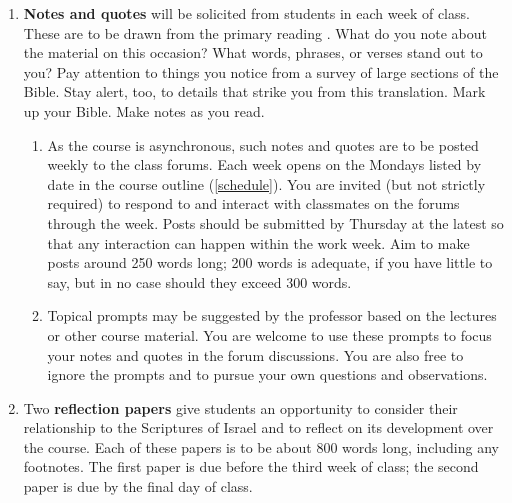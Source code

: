 \documentclass[titlepage]{article}
\begin{document}
\begin{enumerate}

	\item \textbf{Notes and quotes} will be solicited from students in
	each week of class. These are to be drawn from the primary reading
	\cite{njps}. What do you note about the material on this occasion?
	What words, phrases, or verses stand out to you? Pay attention to
	things you notice from a survey of large sections of the Bible. Stay
	alert, too, to details that strike you from this translation. Mark
	up your Bible. Make notes as you read.

	\begin{enumerate}

		\item As the course is asynchronous, such notes and quotes are
		to be posted weekly to the class forums. Each week opens on the
		Mondays listed by date in the course outline
		(\autoref{schedule}). You are invited (but not strictly
		required) to respond to and interact with classmates on the
		forums through the week. Posts should be submitted by Thursday
		at the latest so that any interaction can happen within the work
		week. Aim to make posts around 250 words long; 200 words is
		adequate, if you have little to say, but in no case should they
		exceed 300 words.

		\item Topical prompts may be suggested by the professor based on
		the lectures or other course material. You are welcome to use
		these prompts to focus your notes and quotes in the forum
		discussions. You are also free to ignore the prompts and to
		pursue your own questions and observations.

	\end{enumerate}

	\item Two \textbf{reflection papers} give students an opportunity to
	consider their relationship to the Scriptures of Israel and to
	reflect on its development over the course. Each of these papers is
	to be about 800 words long, including any footnotes. The first paper
	is due before the third week of class; the second paper is due by
	the final day of class.

	\begin{enumerate}


\end{enumerate}
\end{enumerate}
\end{document}
